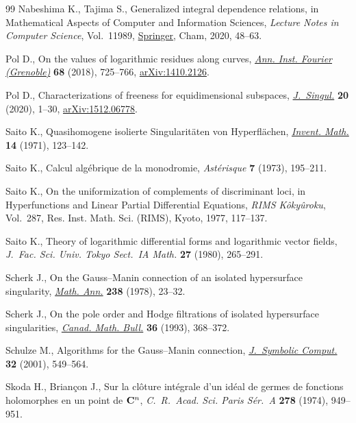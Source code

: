 \documentclass[10pt,a4paper]{amsart}
\numberwithin{equation}{section}
\begin{document}
\begin{thebibliography}{99}
Nabeshima K., Tajima S., Generalized integral dependence relations, in
 Mathematical Aspects of Computer and Information Sciences, \textit{Lecture
 Notes in Computer Science}, Vol.~11989, \href{https://doi.org/10.1007/978-3-030-43120-4_6}{Springer}, Cham, 2020, 48--63.

Pol D., On the values of logarithmic residues along curves, \href{https://doi.org/10.5802/aif.3176}{\textit{Ann. Inst.
 Fourier (Grenoble)}} \textbf{68} (2018), 725--766, \href{https://arxiv.org/abs/1410.2126}{arXiv:1410.2126}.

Pol D., Characterizations of freeness for equidimensional subspaces,
 \href{https://doi.org/10.5427/jsing.2020.20a}{\textit{J.~Singul.}} \textbf{20} (2020), 1--30, \href{https://arxiv.org/abs/1512.06778}{arXiv:1512.06778}.

Saito K., Quasihomogene isolierte {S}ingularit\"aten von {H}yperfl\"achen,
 \href{https://doi.org/10.1007/BF01405360}{\textit{Invent. Math.}} \textbf{14} (1971), 123--142.

Saito K., Calcul alg\'ebrique de la monodromie, \textit{Ast\'erisque}
 \textbf{7} (1973), 195--211.

Saito K., On the uniformization of complements of discriminant loci, in
 Hyperfunctions and Linear Partial Differential Equations, \textit{RIMS
 K\^oky\^uroku}, Vol.~287, Res. Inst. Math. Sci. (RIMS), Kyoto, 1977,
 117--137.

Saito K., Theory of logarithmic differential forms and logarithmic vector
 fields, \textit{J.~Fac. Sci. Univ. Tokyo Sect.~IA Math.} \textbf{27} (1980),
 265--291.

Scherk J., On the {G}auss--{M}anin connection of an isolated hypersurface
 singularity, \href{https://doi.org/10.1007/BF01351450}{\textit{Math. Ann.}} \textbf{238} (1978), 23--32.

Scherk J., On the pole order and {H}odge filtrations of isolated hypersurface
 singularities, \href{https://doi.org/10.4153/CMB-1993-050-9}{\textit{Canad. Math. Bull.}} \textbf{36} (1993), 368--372.

Schulze M., Algorithms for the {G}auss--{M}anin connection, \href{https://doi.org/10.1006/jsco.2001.0482}{\textit{J.~Symbolic
 Comput.}} \textbf{32} (2001), 549--564.

Skoda H., Briançon J., Sur la cl\^oture int\'egrale d'un id\'eal de germes
 de fonctions holomorphes en un point de {${\bf C}^{n}$}, \textit{C.~R.~Acad.
 Sci. Paris S\'er.~A} \textbf{278} (1974), 949--951.


\end{thebibliography}
\end{document}
